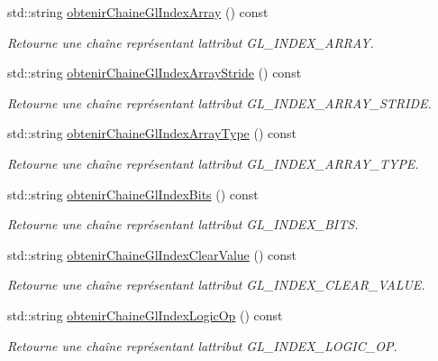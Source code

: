\begin{DoxyCompactItemize}
std\+::string \hyperlink{group__utilitaire_ga63a264a046b4714154de9f26b04ab1f8}{obtenir\+Chaine\+Gl\+Index\+Array} () const 
\begin{DoxyCompactList}\small\item\em Retourne une chaîne représentant l\textquotesingle{}attribut G\+L\+\_\+\+I\+N\+D\+E\+X\+\_\+\+A\+R\+R\+A\+Y. \end{DoxyCompactList}\item 
std\+::string \hyperlink{group__utilitaire_ga79b9f3969a037a0ed02684b41a8a1328}{obtenir\+Chaine\+Gl\+Index\+Array\+Stride} () const 
\begin{DoxyCompactList}\small\item\em Retourne une chaîne représentant l\textquotesingle{}attribut G\+L\+\_\+\+I\+N\+D\+E\+X\+\_\+\+A\+R\+R\+A\+Y\+\_\+\+S\+T\+R\+I\+D\+E. \end{DoxyCompactList}\item 
std\+::string \hyperlink{group__utilitaire_ga8479c06a3ede7442505bb38803be818f}{obtenir\+Chaine\+Gl\+Index\+Array\+Type} () const 
\begin{DoxyCompactList}\small\item\em Retourne une chaîne représentant l\textquotesingle{}attribut G\+L\+\_\+\+I\+N\+D\+E\+X\+\_\+\+A\+R\+R\+A\+Y\+\_\+\+T\+Y\+P\+E. \end{DoxyCompactList}\item 
std\+::string \hyperlink{group__utilitaire_gae88fc4ca05d447c04f08671823a407a3}{obtenir\+Chaine\+Gl\+Index\+Bits} () const 
\begin{DoxyCompactList}\small\item\em Retourne une chaîne représentant l\textquotesingle{}attribut G\+L\+\_\+\+I\+N\+D\+E\+X\+\_\+\+B\+I\+T\+S. \end{DoxyCompactList}\item 
std\+::string \hyperlink{group__utilitaire_gad0d02a72c93d1501432001b500bf6435}{obtenir\+Chaine\+Gl\+Index\+Clear\+Value} () const 
\begin{DoxyCompactList}\small\item\em Retourne une chaîne représentant l\textquotesingle{}attribut G\+L\+\_\+\+I\+N\+D\+E\+X\+\_\+\+C\+L\+E\+A\+R\+\_\+\+V\+A\+L\+U\+E. \end{DoxyCompactList}\item 
std\+::string \hyperlink{group__utilitaire_ga5294ee67327c1a604fe1ac627d539acc}{obtenir\+Chaine\+Gl\+Index\+Logic\+Op} () const 
\begin{DoxyCompactList}\small\item\em Retourne une chaîne représentant l\textquotesingle{}attribut G\+L\+\_\+\+I\+N\+D\+E\+X\+\_\+\+L\+O\+G\+I\+C\+\_\+\+O\+P. \end{DoxyCompactList}\item 

\end{DoxyCompactItemize}
